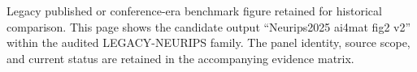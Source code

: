Legacy published or conference-era benchmark figure retained for historical comparison. This page shows the candidate output ``Neurips2025 ai4mat fig2 v2'' within the audited LEGACY-NEURIPS family. The panel identity, source scope, and current status are retained in the accompanying evidence matrix.
